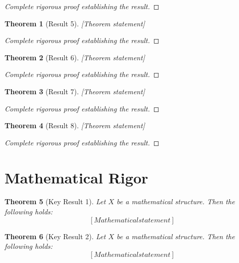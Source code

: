\documentclass[12pt]{article}
\newtheorem{theorem}{Theorem}
\begin{document}
\begin{proof}
[Complete rigorous proof establishing the result]
\end{proof}

\begin{theorem}[Result 5]
[Theorem statement]
\end{theorem}

\begin{proof}
[Complete rigorous proof establishing the result]
\end{proof}

\begin{theorem}[Result 6]
[Theorem statement]
\end{theorem}

\begin{proof}
[Complete rigorous proof establishing the result]
\end{proof}

\begin{theorem}[Result 7]
[Theorem statement]
\end{theorem}

\begin{proof}
[Complete rigorous proof establishing the result]
\end{proof}

\begin{theorem}[Result 8]
[Theorem statement]
\end{theorem}

\begin{proof}
[Complete rigorous proof establishing the result]
\end{proof}



\section{Mathematical Rigor}

\begin{theorem}[Key Result 1]
Let $X$ be a mathematical structure. Then the following holds:
\begin{equation}
\label{eq:theorem_1}
[Mathematical statement]
\end{equation}
\end{theorem}

\begin{theorem}[Key Result 2]
Let $X$ be a mathematical structure. Then the following holds:
\begin{equation}
\label{eq:theorem_2}
[Mathematical statement]
\end{equation}
\end{theorem}
\end{document}
